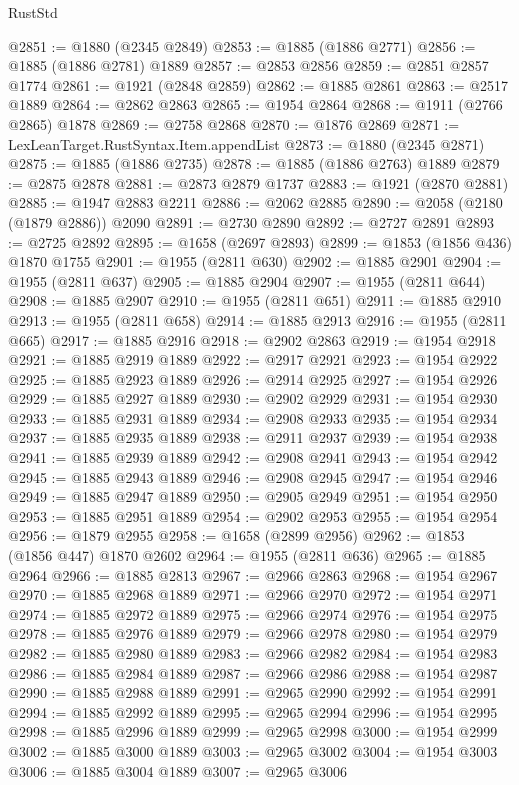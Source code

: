 \begin{lexlean}{RustStd}
\begin{coremodule}
@2851 := @1880 (@2345 @2849)
@2853 := @1885 (@1886 @2771)
@2856 := @1885 (@1886 @2781) @1889
@2857 := @2853 @2856
@2859 := @2851 @2857 @1774
@2861 := @1921 (@2848 @2859)
@2862 := @1885 @2861
@2863 := @2517 @1889
@2864 := @2862 @2863
@2865 := @1954 @2864
@2868 := @1911 (@2766 @2865) @1878
@2869 := @2758 @2868
@2870 := @1876 @2869
@2871 := LexLeanTarget.RustSyntax.Item.appendList
@2873 := @1880 (@2345 @2871)
@2875 := @1885 (@1886 @2735)
@2878 := @1885 (@1886 @2763) @1889
@2879 := @2875 @2878
@2881 := @2873 @2879 @1737
@2883 := @1921 (@2870 @2881)
@2885 := @1947 @2883 @2211
@2886 := @2062 @2885
@2890 := @2058 (@2180 (@1879 @2886)) @2090
@2891 := @2730 @2890
@2892 := @2727 @2891
@2893 := @2725 @2892
@2895 := @1658 (@2697 @2893)
@2899 := @1853 (@1856 @436) @1870 @1755
@2901 := @1955 (@2811 @630)
@2902 := @1885 @2901
@2904 := @1955 (@2811 @637)
@2905 := @1885 @2904
@2907 := @1955 (@2811 @644)
@2908 := @1885 @2907
@2910 := @1955 (@2811 @651)
@2911 := @1885 @2910
@2913 := @1955 (@2811 @658)
@2914 := @1885 @2913
@2916 := @1955 (@2811 @665)
@2917 := @1885 @2916
@2918 := @2902 @2863
@2919 := @1954 @2918
@2921 := @1885 @2919 @1889
@2922 := @2917 @2921
@2923 := @1954 @2922
@2925 := @1885 @2923 @1889
@2926 := @2914 @2925
@2927 := @1954 @2926
@2929 := @1885 @2927 @1889
@2930 := @2902 @2929
@2931 := @1954 @2930
@2933 := @1885 @2931 @1889
@2934 := @2908 @2933
@2935 := @1954 @2934
@2937 := @1885 @2935 @1889
@2938 := @2911 @2937
@2939 := @1954 @2938
@2941 := @1885 @2939 @1889
@2942 := @2908 @2941
@2943 := @1954 @2942
@2945 := @1885 @2943 @1889
@2946 := @2908 @2945
@2947 := @1954 @2946
@2949 := @1885 @2947 @1889
@2950 := @2905 @2949
@2951 := @1954 @2950
@2953 := @1885 @2951 @1889
@2954 := @2902 @2953
@2955 := @1954 @2954
@2956 := @1879 @2955
@2958 := @1658 (@2899 @2956)
@2962 := @1853 (@1856 @447) @1870 @2602
@2964 := @1955 (@2811 @636)
@2965 := @1885 @2964
@2966 := @1885 @2813
@2967 := @2966 @2863
@2968 := @1954 @2967
@2970 := @1885 @2968 @1889
@2971 := @2966 @2970
@2972 := @1954 @2971
@2974 := @1885 @2972 @1889
@2975 := @2966 @2974
@2976 := @1954 @2975
@2978 := @1885 @2976 @1889
@2979 := @2966 @2978
@2980 := @1954 @2979
@2982 := @1885 @2980 @1889
@2983 := @2966 @2982
@2984 := @1954 @2983
@2986 := @1885 @2984 @1889
@2987 := @2966 @2986
@2988 := @1954 @2987
@2990 := @1885 @2988 @1889
@2991 := @2965 @2990
@2992 := @1954 @2991
@2994 := @1885 @2992 @1889
@2995 := @2965 @2994
@2996 := @1954 @2995
@2998 := @1885 @2996 @1889
@2999 := @2965 @2998
@3000 := @1954 @2999
@3002 := @1885 @3000 @1889
@3003 := @2965 @3002
@3004 := @1954 @3003
@3006 := @1885 @3004 @1889
@3007 := @2965 @3006

\end{coremodule}
\end{lexlean}
